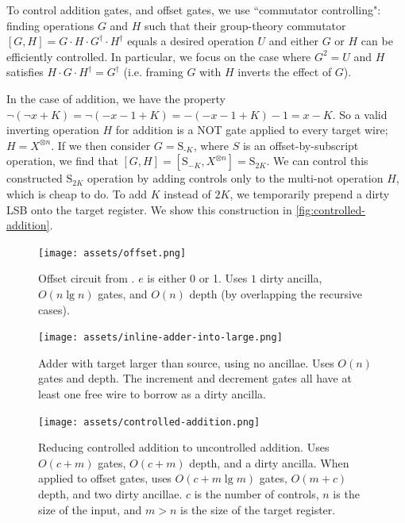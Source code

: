 \documentclass[twocolumn,longbibliography]{quantumarticle-customized}
\begin{document}
To control addition gates, and offset gates, we use ``commutator controlling": finding operations $G$ and $H$ such that their group-theory commutator $[G, H] = G \cdot H \cdot G^\dagger \cdot H^\dagger$ equals a desired operation $U$ and either $G$ or $H$ can be efficiently controlled.
In particular, we focus on the case where $G^2 = U$ and $H$ satisfies $H \cdot G \cdot H^\dagger = G^\dagger$ (i.e. framing $G$ with $H$ inverts the effect of $G$).

In the case of addition, we have the property $\lnot (\lnot x + K) = \lnot (-x - 1 + K) = -(-x - 1 + K) - 1 = x-K$.
So a valid inverting operation $H$ for addition is a NOT gate applied to every target wire; $H=X^{\otimes n}$.
If we then consider $G=\text{S}_{\text{-} K}$, where $S$ is an offset-by-subscript operation, we find that $[G, H] = [\text{S}_{-K}, X^{\otimes n}] = \text{S}_{2K}$.
We can control this constructed $\text{S}_{2K}$ operation by adding controls only to the multi-not operation $H$, which is cheap to do.
To add $K$ instead of $2K$, we temporarily prepend a dirty LSB onto the target register.
We show this construction in \autoref{fig:controlled-addition}.

\begin{figure}
  \centering
  \texttt{[image: assets/offset.png]}
  \caption{
      Offset circuit from \cite{haner2016}.
      $e$ is either 0 or 1.
      Uses $1$ dirty ancilla, $O(n \lg n)$ gates, and $O(n)$ depth (by overlapping the recursive cases).
  }
  \label{fig:offset}
\end{figure}

\begin{figure}
  \centering
  \texttt{[image: assets/inline-adder-into-large.png]}
  \caption{
      Adder with target larger than source, using no ancillae.
      Uses $O(n)$ gates and depth.
      The increment and decrement gates all have at least one free wire to borrow as a dirty ancilla.
  }
  \label{fig:inline-adder-into-large}
\end{figure}

\begin{figure}
  \centering
  \texttt{[image: assets/controlled-addition.png]}
  \caption{
    Reducing controlled addition to uncontrolled addition.
    Uses $O(c + m)$ gates, $O(c + m)$ depth, and a dirty ancilla.
    When applied to offset gates, uses $O(c + m \lg m)$ gates, $O(m + c)$ depth, and two dirty ancillae.
    $c$ is the number of controls, $n$ is the size of the input, and $m > n$ is the size of the target register.
  }
  \label{fig:controlled-addition}
\end{figure}
\end{document}
